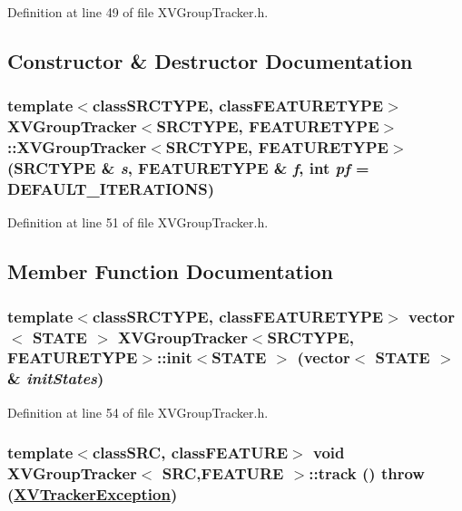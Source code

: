 Definition at line 49 of file XVGroup\-Tracker.h.

\subsection{Constructor \& Destructor Documentation}
\label{XVGroupTracker_a0}
\hypertarget{class_XVGroupTracker_a0}{
\subsubsection[XVGroupTracker]{\setlength{\rightskip}{0pt plus 5cm}template$<$classSRCTYPE, classFEATURETYPE$>$ XVGroup\-Tracker$<$SRCTYPE, FEATURETYPE$>$::XVGroup\-Tracker$<$SRCTYPE, FEATURETYPE$>$ (SRCTYPE \& {\em s}, FEATURETYPE \& {\em f}, int {\em pf} = DEFAULT\_\-ITERATIONS)}}




Definition at line 51 of file XVGroup\-Tracker.h.

\subsection{Member Function Documentation}
\label{XVGroupTracker_a1}
\hypertarget{class_XVGroupTracker_a1}{
\subsubsection[init]{\setlength{\rightskip}{0pt plus 5cm}template$<$classSRCTYPE, classFEATURETYPE$>$ vector$<$ STATE $>$ XVGroup\-Tracker$<$SRCTYPE, FEATURETYPE$>$::init$<$STATE $>$ (vector$<$ STATE $>$\& {\em init\-States})}}




Definition at line 54 of file XVGroup\-Tracker.h.\label{XVGroupTracker_a2}
\hypertarget{class_XVGroupTracker_a2}{
\subsubsection[track]{\setlength{\rightskip}{0pt plus 5cm}template$<$classSRC, classFEATURE$>$ void XVGroup\-Tracker$<$ SRC,FEATURE $>$::track ()  throw (\hyperlink{class_XVTrackerException}{XVTracker\-Exception})}}




